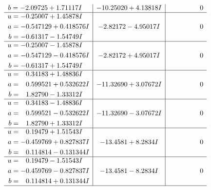 \documentclass[1p]{elsarticle_modified}
\theoremstyle{definition}
\begin{document}
$$\begin{array}{c|c|c}
\begin{aligned}
b &= -2.09725 + 1.71117 I\end{aligned}
 & -10.25020 + 4.13818 I & \phantom{-0.000000 } 0 \\ \hline\begin{aligned}
u &= -0.25007 + 1.45878 I \\
a &= -0.547129 + 0.418576 I \\
b &= -0.61317 - 1.54749 I\end{aligned}
 & -2.82172 - 4.95017 I & \phantom{-0.000000 } 0 \\ \hline\begin{aligned}
u &= -0.25007 - 1.45878 I \\
a &= -0.547129 - 0.418576 I \\
b &= -0.61317 + 1.54749 I\end{aligned}
 & -2.82172 + 4.95017 I & \phantom{-0.000000 } 0 \\ \hline\begin{aligned}
u &= \phantom{-}0.34183 + 1.48836 I \\
a &= \phantom{-}0.599521 + 0.532622 I \\
b &= \phantom{-}1.82790 - 1.33312 I\end{aligned}
 & -11.32690 + 3.07672 I & \phantom{-0.000000 } 0 \\ \hline\begin{aligned}
u &= \phantom{-}0.34183 - 1.48836 I \\
a &= \phantom{-}0.599521 - 0.532622 I \\
b &= \phantom{-}1.82790 + 1.33312 I\end{aligned}
 & -11.32690 - 3.07672 I & \phantom{-0.000000 } 0 \\ \hline\begin{aligned}
u &= \phantom{-}0.19479 + 1.51543 I \\
a &= -0.459769 + 0.827837 I \\
b &= \phantom{-}0.114814 - 0.131344 I\end{aligned}
 & -13.4581 + 8.2834 I & \phantom{-0.000000 } 0 \\ \hline\begin{aligned}
u &= \phantom{-}0.19479 - 1.51543 I \\
a &= -0.459769 - 0.827837 I \\
b &= \phantom{-}0.114814 + 0.131344 I\end{aligned}
 & -13.4581 - 8.2834 I & \phantom{-0.000000 } 0\\
 \hline 
 \end{array}$$\newpage$$\begin{array}{c|c|c}  

\end{array}$$
\end{document}
